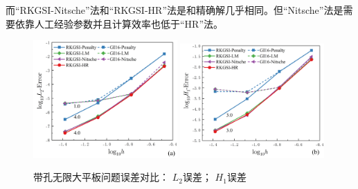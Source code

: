 而“RKGSI-Nitsche”法和“RKGSI-HR”法是和精确解几乎相同。但“Nitsche”法是需要依靠人工经验参数并且计算效率也低于“HR”法。
\newpage
\begin{figure}[H]
\centering
\begin{subcaptiongroup}
        \includegraphics[width=0.49\textwidth]{figure/EHR/hole/L2.png}
        \label{HL2}
        \includegraphics[width=0.49\textwidth]{figure/EHR/hole/H1.png}
        \label{HH1}
        \end{subcaptiongroup}
    \caption{带孔无限大平板问题误差对比： $L_2$误差； $H_1$误差}
    \label{EHLH}
    \end{figure}
